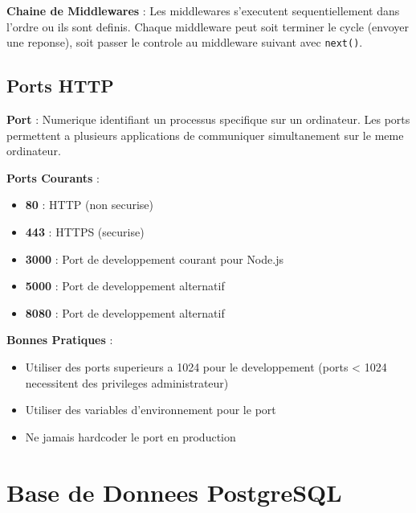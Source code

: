 \documentclass[a4paper,12pt]{book}
\begin{document}
\begin{architecturebox}
    \textbf{Chaine de Middlewares} : Les middlewares s'executent sequentiellement dans l'ordre ou ils sont definis. Chaque middleware peut soit terminer le cycle (envoyer une reponse), soit passer le controle au middleware suivant avec \texttt{next()}.
\end{architecturebox}

\section{Ports HTTP}

\begin{definitionbox}
    \textbf{Port} : Numerique identifiant un processus specifique sur un ordinateur. Les ports permettent a plusieurs applications de communiquer simultanement sur le meme ordinateur.
\end{definitionbox}

\textbf{Ports Courants} :
\begin{itemize}
    \item \textbf{80} : HTTP (non securise)
    \item \textbf{443} : HTTPS (securise)
    \item \textbf{3000} : Port de developpement courant pour Node.js
    \item \textbf{5000} : Port de developpement alternatif
    \item \textbf{8080} : Port de developpement alternatif
\end{itemize}

\begin{bestpracticebox}
    \textbf{Bonnes Pratiques} :
    \begin{itemize}
        \item Utiliser des ports superieurs a 1024 pour le developpement (ports < 1024 necessitent des privileges administrateur)
        \item Utiliser des variables d'environnement pour le port
        \item Ne jamais hardcoder le port en production
    \end{itemize}
\end{bestpracticebox}

\chapter{Base de Donnees PostgreSQL}
\end{document}
